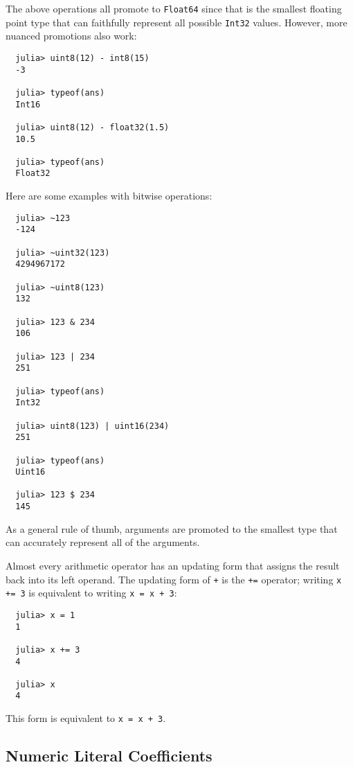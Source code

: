 \documentclass{article}
\begin{document}
The above operations all promote to \verb|Float64| since that is the smallest floating point type that can faithfully represent all possible \verb|Int32| values.
However, more nuanced promotions also work:
\begin{verbatim}
  julia> uint8(12) - int8(15)
  -3

  julia> typeof(ans)
  Int16

  julia> uint8(12) - float32(1.5)
  10.5

  julia> typeof(ans)
  Float32
\end{verbatim}
Here are some examples with bitwise operations:
\begin{verbatim}
  julia> ~123
  -124

  julia> ~uint32(123)
  4294967172

  julia> ~uint8(123)
  132

  julia> 123 & 234
  106

  julia> 123 | 234
  251

  julia> typeof(ans)
  Int32

  julia> uint8(123) | uint16(234)
  251

  julia> typeof(ans)
  Uint16

  julia> 123 $ 234
  145
\end{verbatim}
As a general rule of thumb, arguments are promoted to the smallest type that can accurately represent all of the arguments.

Almost every arithmetic operator has an updating form that assigns the result back into its left operand.
The updating form of \verb|+| is the \verb|+=| operator;
writing \verb|x += 3| is equivalent to writing \verb|x = x + 3|:
\begin{verbatim}
  julia> x = 1
  1

  julia> x += 3
  4

  julia> x
  4
\end{verbatim}

This form is equivalent to \verb|x = x + 3|.

\subsection{Numeric Literal Coefficients}
\end{document}
